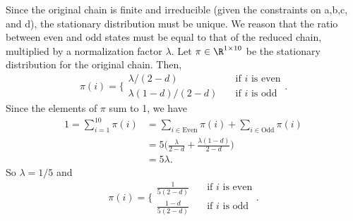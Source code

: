 \documentclass{homework}
\begin{document}
\begin{letterenum}
Since the original chain is finite and irreducible (given the constraints on a,b,c, and d),
the stationary distribution must be unique. We reason that the ratio between
even and odd states must be equal to that of the reduced chain, multiplied by 
a normalization factor $\lambda$. Let $\pi \in \R^{1 \times 10}$ be the
stationary distribution for the original chain. Then,
\begin{equation*}
    \pi(i) = \biggl\{
        \begin{array}{ll}
            \lambda / (2 - d) &\quad \text{if }i \text{ is even} \\
            \lambda (1 - d) / (2 - d) &\quad \text{if }i \text{ is odd}
        \end{array}
    \biggr.
\end{equation*}
Since the elements of $\pi$ sum to 1, we have
\begin{align*}
    1 = \sum_{i=1}^{10} \pi(i) &= \sum_{i\in \text{Even}} \pi(i)
        + \sum_{i\in \text{Odd}} \pi(i) \\
        &= 5 \biggl(\frac{\lambda}{2 - d} + \frac{\lambda (1 - d)}{2-d} \biggr) \\
        &= 5\lambda.
\end{align*}
So $\lambda = 1/5$ and 
\begin{equation*}
    \pi(i) = \biggl\{
        \begin{array}{ll}
            \frac{1}{5(2 - d)} &\quad \text{if }i \text{ is even} \\
            \frac{1 - d}{5(2 - d)} &\quad \text{if }i \text{ is odd}
        \end{array}
    \biggr.
\end{equation*}
\end{letterenum}
\end{document}
